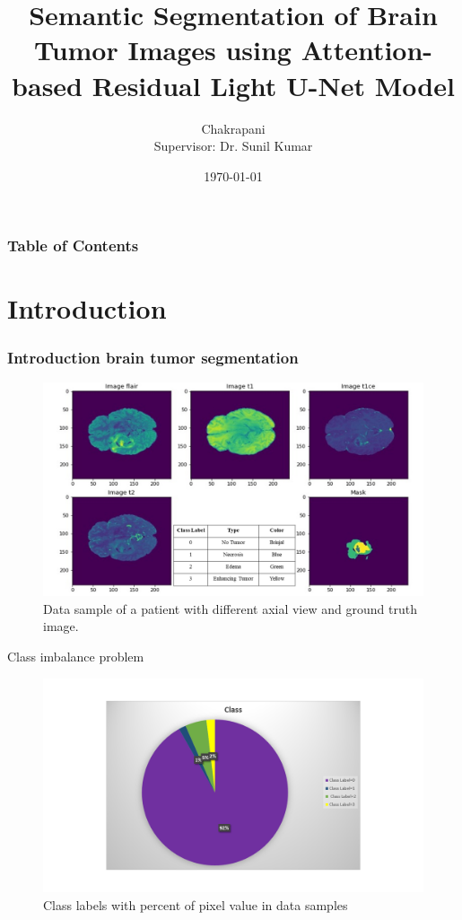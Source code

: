 \documentclass [xcolor=svgnames, t] {beamer}
\title[ARLU-Net]{Semantic Segmentation of Brain Tumor Images using Attention-based Residual Light U-Net Model}
\author[Chakrapani]{Chakrapani\\[4mm]{\small Supervisor: Dr. Sunil Kumar}}
\institute[2020IS-02]{ABV-IIITM, Gwalior}
\date{\today}
\begin{document}
\begin{frame}
\maketitle
\end{frame}



\justifying

\begin{frame}
\frametitle{Table of Contents}
\tableofcontents
\end{frame}

\section{Introduction}
\begin{frame}\frametitle{Introduction brain tumor segmentation}
\begin{figure}[H]
\centering
\includegraphics[width=12cm]{2021 sample.png}
\caption{Data sample of a patient with different axial view and ground truth image.}
\end{figure}
\end{frame}

\begin{frame}{Class imbalance problem}
    \begin{figure}[H]
\includegraphics[width=1\linewidth]{class label.png}
\caption{Class labels with percent of pixel value in data samples}
\end{figure}
\end{frame}
\end{document}
